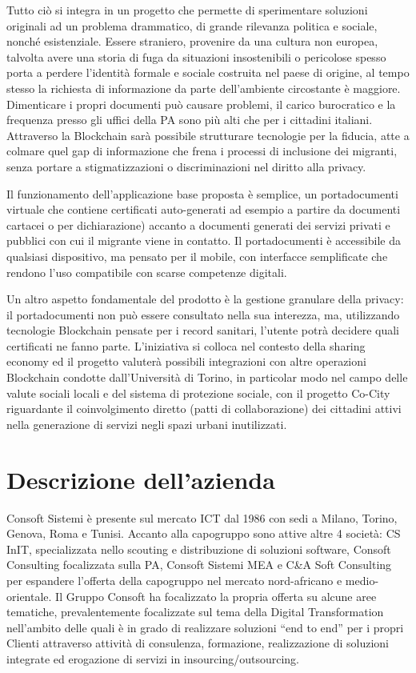 Tutto ciò si integra in un progetto che permette di sperimentare soluzioni originali ad
un problema drammatico, di grande rilevanza politica e sociale, nonché esistenziale.
Essere straniero, provenire da una cultura non europea, talvolta avere una storia di fuga da situazioni insostenibili
o pericolose spesso porta a perdere l’identità formale e sociale costruita nel paese di origine, al tempo stesso la richiesta
di informazione da parte dell’ambiente circostante è maggiore. Dimenticare i propri documenti può causare problemi,
il carico burocratico e la frequenza presso gli uffici della PA sono più alti che per i cittadini italiani.
Attraverso la Blockchain sarà possibile strutturare tecnologie per la fiducia, atte a colmare quel gap di informazione che frena
i processi di inclusione dei migranti, senza portare a stigmatizzazioni o discriminazioni nel diritto alla privacy.

Il funzionamento dell’applicazione base proposta è semplice, un portadocumenti virtuale che contiene certificati auto-generati 
ad esempio a partire da documenti cartacei o per dichiarazione) accanto a documenti generati dei servizi privati e pubblici con cui il migrante viene in contatto.
Il portadocumenti è accessibile da qualsiasi dispositivo, ma pensato per il mobile, con interfacce semplificate che rendono
l’uso compatibile con scarse competenze digitali.

Un altro aspetto fondamentale del prodotto è la gestione granulare della privacy: il portadocumenti non può essere consultato
nella sua interezza, ma, utilizzando tecnologie Blockchain pensate per i record sanitari, l’utente potrà decidere quali certificati ne fanno parte.
L’iniziativa si colloca nel contesto della sharing economy ed il progetto valuterà possibili integrazioni con altre operazioni Blockchain
condotte dall’Università di Torino, in particolar modo nel campo delle valute sociali locali e del sistema di protezione sociale,
con il progetto Co-City riguardante il coinvolgimento diretto (patti di collaborazione) dei cittadini attivi nella generazione di servizi negli spazi urbani inutilizzati.


\section{Descrizione dell'azienda}
Consoft Sistemi è presente sul mercato ICT dal 1986 con sedi a Milano, Torino, Genova, Roma e Tunisi.
Accanto alla capogruppo sono attive altre 4 società: CS InIT, specializzata nello scouting e distribuzione di soluzioni software, Consoft Consulting 
focalizzata sulla PA, Consoft Sistemi MEA e C\&A Soft Consulting per espandere l’offerta della capogruppo nel mercato nord-africano e medio-orientale. 
Il Gruppo Consoft ha focalizzato la propria offerta su alcune aree tematiche, prevalentemente focalizzate sul tema della Digital Transformation nell’ambito
delle quali è in grado di realizzare soluzioni “end to end” per i propri Clienti attraverso attività di consulenza, formazione, realizzazione di soluzioni
integrate ed erogazione di servizi in insourcing/outsourcing.

